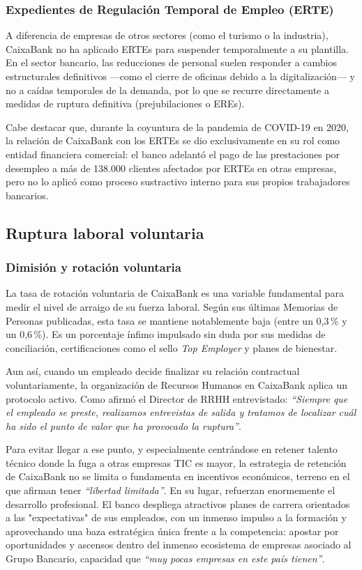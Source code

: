 \subsubsection{Expedientes de Regulación Temporal de Empleo (ERTE)}

A diferencia de empresas de otros sectores (como el turismo o la industria), CaixaBank no ha aplicado ERTEs para suspender temporalmente a su plantilla. En el sector bancario, las reducciones de personal suelen responder a cambios estructurales definitivos —como el cierre de oficinas debido a la digitalización— y no a caídas temporales de la demanda, por lo que se recurre directamente a medidas de ruptura definitiva (prejubilaciones o EREs).

Cabe destacar que, durante la coyuntura de la pandemia de COVID-19 en 2020, la relación de CaixaBank con los ERTEs se dio exclusivamente en su rol como entidad financiera comercial: el banco adelantó el pago de las prestaciones por desempleo a más de 138.000 clientes afectados por ERTEs en otras empresas, pero no lo aplicó como proceso sustractivo interno para sus propios trabajadores bancarios.

\subsection{Ruptura laboral voluntaria}

\subsubsection{Dimisión y rotación voluntaria}

La tasa de rotación voluntaria de CaixaBank es una variable fundamental para medir el nivel de arraigo de su fuerza laboral. Según sus últimas Memorias de Personas publicadas, esta tasa se mantiene notablemente baja (entre un 0,3\,\% y un 0,6\,\%). Es un porcentaje ínfimo impulsado sin duda por sus medidas de conciliación, certificaciones como el sello \textit{Top Employer} y planes de bienestar.

Aun así, cuando un empleado decide finalizar su relación contractual voluntariamente, la organización de Recursos Humanos en CaixaBank aplica un protocolo activo. Como afirmó el Director de RRHH entrevistado: \textit{``Siempre que el empleado se preste, realizamos entrevistas de salida y tratamos de localizar cuál ha sido el punto de valor que ha provocado la ruptura''}. 

Para evitar llegar a ese punto, y especialmente centrándose en retener talento técnico donde la fuga a otras empresas TIC es mayor, la estrategia de retención de CaixaBank no se limita o fundamenta en incentivos económicos, terreno en el que afirman tener \textit{``libertad limitada''}. En su lugar, refuerzan enormemente el desarrollo profesional. El banco despliega atractivos planes de carrera orientados a las "expectativas" de sus empleados, con un inmenso impulso a la formación y aprovechando una baza estratégica única frente a la competencia: apostar por oportunidades y ascensos dentro del inmenso ecosistema de empresas asociado al Grupo Bancario, capacidad que \textit{``muy pocas empresas en este país tienen''}.

